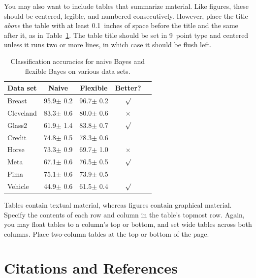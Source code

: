 \documentclass{article}
\begin{document}
You may also want to include tables that summarize material. Like
figures, these should be centered, legible, and numbered consecutively.
However, place the title \emph{above} the table with at least
0.1~inches of space before the title and the same after it, as in
Table~\ref{sample-table}. The table title should be set in 9~point
type and centered unless it runs two or more lines, in which case it
should be flush left.


\begin{table}[t]
\caption{Classification accuracies for naive Bayes and flexible
Bayes on various data sets.}
\label{sample-table}
\vskip 0.15in
\begin{center}
\begin{small}
\begin{sc}
\begin{tabular}{lcccr}
\toprule
Data set & Naive & Flexible & Better? \\
\midrule
Breast    & 95.9$\pm$ 0.2& 96.7$\pm$ 0.2& $\surd$ \\
Cleveland & 83.3$\pm$ 0.6& 80.0$\pm$ 0.6& $\times$\\
Glass2    & 61.9$\pm$ 1.4& 83.8$\pm$ 0.7& $\surd$ \\
Credit    & 74.8$\pm$ 0.5& 78.3$\pm$ 0.6&         \\
Horse     & 73.3$\pm$ 0.9& 69.7$\pm$ 1.0& $\times$\\
Meta      & 67.1$\pm$ 0.6& 76.5$\pm$ 0.5& $\surd$ \\
Pima      & 75.1$\pm$ 0.6& 73.9$\pm$ 0.5&         \\
Vehicle   & 44.9$\pm$ 0.6& 61.5$\pm$ 0.4& $\surd$ \\
\bottomrule
\end{tabular}
\end{sc}
\end{small}
\end{center}
\vskip -0.1in
\end{table}

Tables contain textual material, whereas figures contain graphical material.
Specify the contents of each row and column in the table's topmost
row. Again, you may float tables to a column's top or bottom, and set
wide tables across both columns. Place two-column tables at the
top or bottom of the page.

\section{Citations and References}
\end{document}
